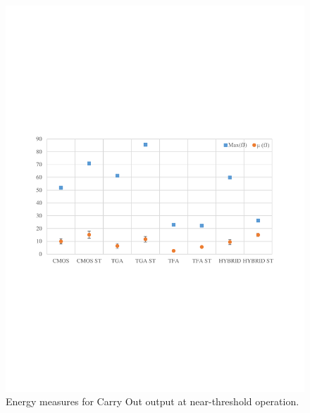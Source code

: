\documentclass[ecp,tc, english]{iiufrgs}
\begin{document}
\begin{figure}[H]
\centering
\includegraphics[width=\textwidth, trim={0 9cm 0 9cm},clip]{energyNTCarryOut.pdf}
\caption{Energy measures for Carry Out output at near-threshold operation.}
\label{fig:Fig410}
\end{figure}
\end{document}
